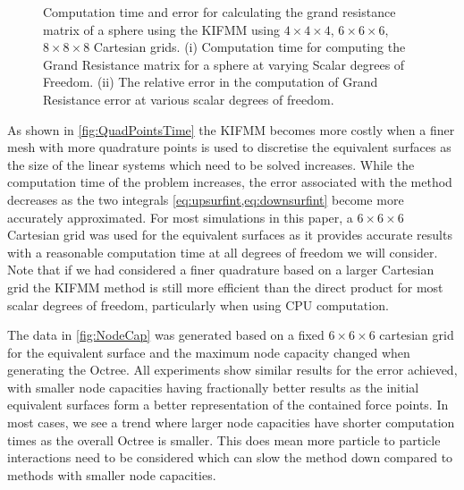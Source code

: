 \begin{figure}[ht]
\begin{subfigure}[b]{0.49\textwidth}
         \caption{\label{fig:QuadPointsError}}
     \end{subfigure}
        \caption[Computation time and error for calculating the grand resistance matrix of a sphere using the KIFMM using $4\times4\times4$, $6\times6\times6$, $8\times8\times8$ Cartesian grids.]{Computation time and error for calculating the grand resistance matrix of a sphere using the KIFMM using $4\times4\times4$, $6\times6\times6$, $8\times8\times8$ Cartesian grids. (i) Computation time for computing the Grand Resistance matrix for a sphere at varying Scalar degrees of Freedom. (ii) The relative error in the computation of Grand Resistance error at various scalar degrees of freedom.}
        \label{fig:QuadPoints}
\end{figure}

As shown in \cref{fig:QuadPointsTime} the KIFMM becomes more costly when a finer mesh with more quadrature points is used to discretise the equivalent surfaces as the size of the linear systems which need to be solved increases. While the computation time of the problem increases, the error associated with the method decreases as the two integrals \cref{eq:upsurfint,eq:downsurfint} become more accurately approximated. For most simulations in this paper, a $6\times6\times6$ Cartesian grid was used for the equivalent surfaces as it provides accurate results with a reasonable computation time at all degrees of freedom we will consider. Note that if we had considered a finer quadrature based on a larger Cartesian grid the KIFMM method is still more efficient than the direct product for most scalar degrees of freedom, particularly when using CPU computation. 

The data in \cref{fig:NodeCap} was generated based on a fixed $6\times6\times6$ cartesian grid for the equivalent surface and the maximum node capacity changed when generating the Octree. All experiments show similar results for the error achieved, with smaller node capacities having fractionally better results as the initial equivalent surfaces form a better representation of the contained force points. In most cases, we see a trend where larger node capacities have shorter computation times as the overall Octree is smaller. This does mean more particle to particle interactions need to be considered which can slow the method down compared to methods with smaller node capacities. 

